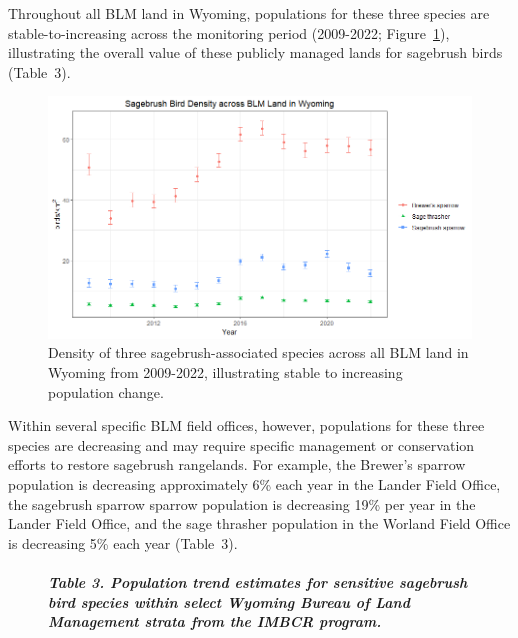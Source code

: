 \documentclass[
  letterpaper,
  DIV=11,
  numbers=noendperiod,
  oneside]{scrreprt}
\let\oldparagraph\paragraph
\renewcommand{\paragraph}[1]{\oldparagraph{#1}\mbox{}}
\begin{document}
Throughout all BLM land in Wyoming, populations for these three species
are stable-to-increasing across the monitoring period (2009-2022;
Figure~\ref{fig-blm-wy-sage}), illustrating the overall value of these
publicly managed lands for sagebrush birds (Table~{3}).

\begin{figure}

{\centering \includegraphics{./BLM-WY-density-trend.png}

}

\caption{\label{fig-blm-wy-sage}Density of three sagebrush-associated
species across all BLM land in Wyoming from 2009-2022, illustrating
stable to increasing population change.}

\end{figure}

Within several specific BLM field offices, however, populations for
these three species are decreasing and may require specific management
or conservation efforts to restore sagebrush rangelands. For example,
the Brewer's sparrow population is decreasing approximately 6\% each
year in the Lander Field Office, the sagebrush sparrow sparrow
population is decreasing 19\% per year in the Lander Field Office, and
the sage thrasher population in the Worland Field Office is decreasing
5\% each year (Table~{3}).

\begin{figure}

\hypertarget{sec-table-3}{%
\paragraph{\texorpdfstring{\emph{Table 3. Population trend estimates for
sensitive sagebrush bird species within select Wyoming Bureau of Land
Management strata from the IMBCR
program.}}{Table 3. Population trend estimates for sensitive sagebrush bird species within select Wyoming Bureau of Land Management strata from the IMBCR program.}}\label{sec-table-3}}

\end{figure}
\end{document}
